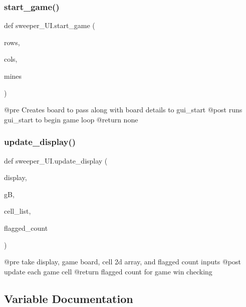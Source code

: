 \subsubsection{\texorpdfstring{start\+\_\+game()}{start\_game()}}
{\footnotesize\ttfamily def sweeper\+\_\+\+U\+I.\+start\+\_\+game (\begin{DoxyParamCaption}\item[{}]{rows,  }\item[{}]{cols,  }\item[{}]{mines }\end{DoxyParamCaption})}

\begin{DoxyVerb}@pre Creates board to pass along with board details to gui_start
@post runs gui_start to begin game loop
@return none
\end{DoxyVerb}
 \mbox{\label{namespacesweeper___u_i_a0b6997d23bebdf719e9ba3f83bb89b1a}} 
\subsubsection{\texorpdfstring{update\+\_\+display()}{update\_display()}}
{\footnotesize\ttfamily def sweeper\+\_\+\+U\+I.\+update\+\_\+display (\begin{DoxyParamCaption}\item[{}]{display,  }\item[{}]{gB,  }\item[{}]{cell\+\_\+list,  }\item[{}]{flagged\+\_\+count }\end{DoxyParamCaption})}

\begin{DoxyVerb}@pre take display, game board, cell 2d array, and flagged count inputs
@post update each game cell
@return flagged count for game win checking
\end{DoxyVerb}
 

\subsection{Variable Documentation}
\mbox{\label{namespacesweeper___u_i_a7d0e80394d61cdf349f0f82925f988a1}} 

